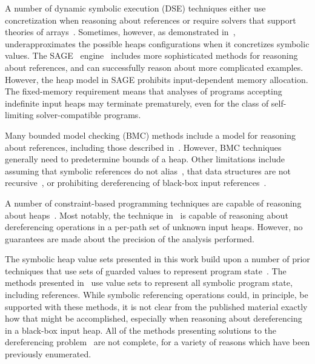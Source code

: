 A number of dynamic symbolic execution (DSE) techniques either use
concretization when reasoning about references or require solvers that
support theories of
arrays~\cite{Godefroid:2005,Sen:2005,Godefroid:POPL07,Tillmann:2008}. Sometimes,
however, as demonstrated in~\cite{Elkarablieh:2009},~\dsetxt{}
underapproximates the possible heaps configurations when it
concretizes symbolic values. The SAGE~\dsetxt{}
engine~\cite{Elkarablieh:2009} includes more sophisticated methods for
reasoning about references, and can successfully reason about more
complicated examples. However, the heap model in SAGE prohibits
input-dependent memory allocation. The fixed-memory requirement means
that analyses of programs accepting indefinite input heaps may
terminate prematurely, even for the class of self-limiting
solver-compatible programs.

Many bounded model checking (BMC) methods include a model for
reasoning about references, including those described
in~\cite{Clarke:2004,Barnett:2006,Xie:2005,Babic:2007,Dillig:2011}. However,
BMC techniques generally need to predetermine bounds of a heap. Other
limitations include assuming that symbolic references do not
alias~\cite{Xie:2005,Babic:2007}, that data structures are not
recursive~\cite{Dillig:2011}, or prohibiting dereferencing of
black-box input references~\cite{Clarke:2004}.

A number of constraint-based programming techniques are capable of
reasoning about
heaps~\cite{Degrave:2010,Charreteur:2009,Albert:2013}. Most notably,
the technique in~\cite{Albert:2013} is capable of reasoning about
dereferencing operations in a per-path set of unknown input
heaps. However, no guarantees are made about the precision of the
analysis performed.

The symbolic heap value sets presented in this work build upon a
number of prior techniques that use sets of guarded values to
represent program
state~\cite{Sen:2014,Torlak:2014,Yorsh:2008,Xie:2005,Dillig:2011,Elkarablieh:2009}. The
methods presented in~\cite{Sen:2014,Torlak:2014,Yorsh:2008} use value
sets to represent all symbolic program state, including
references. While symbolic referencing operations could, in principle,
be supported with these methods, it is not clear from the published
material exactly how that might be accomplished, especially when
reasoning about dereferencing in a black-box input heap. All of the
methods presenting solutions to the dereferencing
problem~\cite{Xie:2005,Dillig:2011,Elkarablieh:2009} are not complete,
for a variety of reasons which have been previously enumerated.

